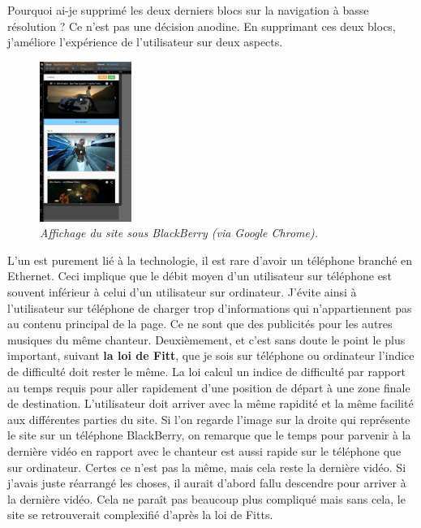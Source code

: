 \documentclass{article}
\begin{document}
\hspace*{0.6cm}Pourquoi ai-je supprim\'e les deux derniers blocs sur la navigation \`a basse r\'esolution ? Ce n'est pas une d\'ecision anodine. En supprimant ces deux blocs, j'am\'eliore l'exp\'erience de l'utilisateur sur deux aspects.\\
\begin{figure}
\vspace{-13pt}
\centering
\includegraphics[width=3cm]{blackberry}
\caption{\textit{Affichage du site sous BlackBerry (via Google Chrome).}}
\end{figure} 
{\hspace*{0.6cm}L'un est purement li\'e \`a la technologie, il est rare d'avoir un t\'el\'ephone branch\'e en Ethernet. Ceci implique que le d\'ebit moyen d'un utilisateur sur t\'el\'ephone est souvent inf\'erieur \`a celui d'un utilisateur sur ordinateur. J'\'evite ainsi \`a l'utilisateur sur t\'el\'ephone de charger trop d'informations qui n'appartiennent pas au contenu principal de la page. Ce ne sont que des publicit\'es pour les autres musiques du m\^eme chanteur. Deuxi\`emement, et c'est sans doute le point le plus important, suivant \textbf{la loi de Fitt}, que je sois sur t\'el\'ephone ou ordinateur l'indice de difficult\'e doit rester le m\^eme. La loi calcul un indice de difficult\'e par rapport au temps requis pour aller rapidement d'une position de d\'epart \`a une zone finale de destination. L'utilisateur doit arriver avec la m\^eme rapidit\'e et la m\^eme facilit\'e aux diff\'erentes parties du site. Si l'on regarde l'image sur la droite qui repr\'esente le site sur un t\'el\'ephone BlackBerry, on remarque que le temps pour parvenir \`a la derni\`ere vid\'eo en rapport avec le chanteur est aussi rapide sur le t\'el\'ephone que sur ordinateur. Certes ce n'est pas la m\^eme, mais cela reste la derni\`ere vid\'eo. Si j'avais juste r\'earrang\'e les choses, il aurait d'abord fallu descendre pour arriver \`a la derni\`ere vid\'eo. Cela ne para\^it pas beaucoup plus compliqu\'e mais sans cela, le site se retrouverait complexifi\'e d'apr\`es la loi de Fitts.}\\
\end{document}

